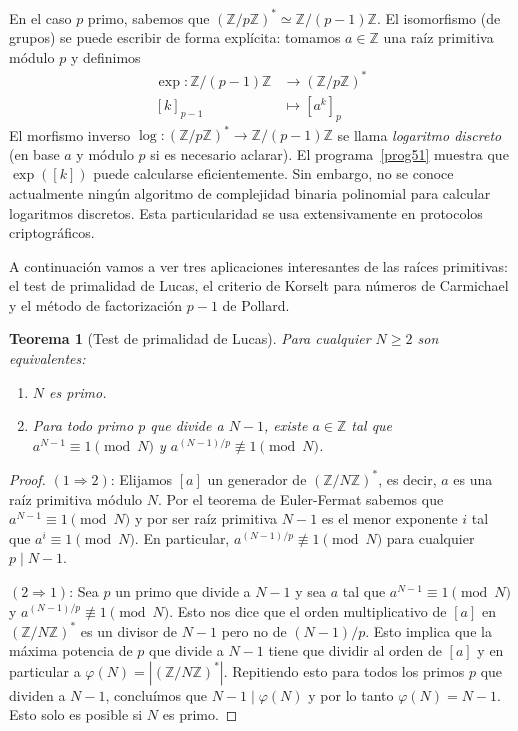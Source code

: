 \documentclass[a4paper, 11pt]{article}
\newcommand{\ZZ}{\mathbb{Z}}
\newcounter{numerodetema}
\theoremstyle{plain}
\newtheorem{teor}{Teorema}[numerodetema]
\theoremstyle{definition}
\begin{document}
En el caso $p$ primo, sabemos que $(\ZZ/p\ZZ)^*\simeq\ZZ/(p-1)\ZZ$. El
isomorfismo (de grupos) se puede escribir de forma explícita: tomamos
$a\in\ZZ$ una raíz primitiva módulo $p$ y definimos
\[
\begin{aligned}
\exp:\ZZ/(p-1)\ZZ  &\rightarrow(\ZZ/p\ZZ)^* \\
               [k]_{p-1} &\mapsto [a^k]_p
\end{aligned}
\]
El morfismo inverso $\log:(\ZZ/p\ZZ)^*\rightarrow\ZZ/(p-1)\ZZ$ se llama
\emph{logaritmo discreto} (en base $a$ y módulo $p$ si es necesario aclarar).
El programa~\ref{prog51} muestra que $\exp([k])$ puede calcularse eficientemente.
Sin embargo, no se conoce actualmente ningún algoritmo de complejidad binaria
polinomial para calcular logaritmos discretos. Esta particularidad se usa
extensivamente en protocolos criptográficos.

\bigskip

A continuación vamos a ver tres aplicaciones interesantes de las raíces
primitivas: el test de primalidad de Lucas, el criterio de Korselt para
números de Carmichael y el método de factorización $p-1$ de Pollard.

\begin{teor}[Test de primalidad de Lucas]
Para cualquier $N\geq 2$ son equivalentes:
\begin{enumerate}
\item $N$ es primo.
\item Para todo primo $p$ que divide a $N-1$, existe $a\in\ZZ$ tal que
$a^{N-1}\equiv1\pmod{N}$ y $a^{(N-1)/p}\not\equiv1\pmod{N}$.
\end{enumerate}
\end{teor}
\begin{proof}
$(1\Rightarrow 2)$: Elijamos $[a]$ un generador de $(\ZZ/N\ZZ)^*$,
es decir, $a$ es una raíz primitiva módulo $N$. Por el teorema de Euler-Fermat
sabemos que $a^{N-1}\equiv1\pmod{N}$ y por ser raíz primitiva $N-1$ es el
menor exponente $i$ tal que $a^i\equiv1\pmod{N}$. En particular,
$a^{(N-1)/p}\not\equiv1\pmod{N}$ para cualquier $p\mid N-1$.

$(2\Rightarrow 1)$: Sea $p$ un primo que divide a $N-1$ y sea $a$ tal
que $a^{N-1}\equiv1\pmod{N}$ y $a^{(N-1)/p}\not\equiv1\pmod{N}$. Esto nos
dice que el orden multiplicativo de $[a]$ en $(\ZZ/N\ZZ)^*$ es un divisor
de $N-1$ pero no de $(N-1)/p$. Esto implica que la máxima potencia de $p$
que divide a $N-1$ tiene que dividir al orden de $[a]$ y en particular a
$\varphi(N)=|(\ZZ/N\ZZ)^*|$. Repitiendo esto para todos los primos $p$ que
dividen a $N-1$, concluímos que $N-1\mid\varphi(N)$ y por lo tanto
$\varphi(N)=N-1$. Esto solo es posible si $N$ es primo.
\end{proof}
\end{document}
